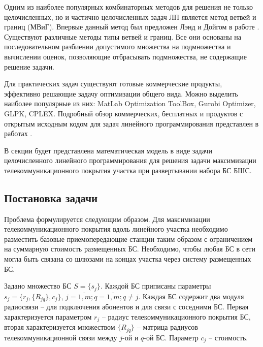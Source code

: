 Одним из наиболее популярных комбинаторных методов для решения не только целочисленных, но и частично целочисленных задач ЛП является метод ветвей и границ (МВиГ). Впервые данный метод  был предложен Лэнд и Дойгом в работе \cite{Land1960}. Существуют различные методы типы ветвей и границ. Все они основаны на последовательном разбиении допустимого множества на подмножества и вычислении оценок, позволяющие отбрасывать подмножества, не содержащие решение задачи.





Для  практических задач существуют готовые коммерческие продукты, эффективно решающие задачу оптимизации общего вида. Можно выделить наиболее популярные из них: MatLab Optimization ToolBox, Gurobi Optimizer, GLPK, CPLEX. Подробный обзор коммерческих, бесплатных и продуктов с открытым исходным кодом для задач линейного программирования представлен в работах \cite{Meindl2012, Ku2016, Anand2017}. 

В секции будет представлена математическая модель в виде задачи целочисленного линейного программирования для решения задачи максимизации телекоммуникационного покрытия участка при развертывании набора БС БШС.

\subsection{Постановка задачи}

Проблема формулируется следующим образом. Для максимизации телекоммуникационного покрытия вдоль линейного участка необходимо разместить базовые приемопередающие станции таким образом с ограничением на суммарную стоимость размещенных БС. Необходимо, чтобы любая БС в сети могла быть связана со шлюзами на концах участка через систему размещенных БС.

Задано множество БС $S = \{s_j\}$. Каждой БС приписаны параметры  $s_j = \{r_j, \{R_{jq}\}, c_j \}$, $j = \overline{1,m}; q = \overline{1,m}; q \neq j$. 
Каждая БС содержит два модуля радиосвязи -- для подключения абонентов и для связи с соседними БС. Первая характеризуется параметром $r_j$ -- радиус телекоммуникационного покрытия БС, вторая характеризуется множеством $\{R_{jq} \}$ -- матрица радиусов телекоммуникационной связи между $j$-ой и $q$-ой БС. Параметр $c_j$ -- стоимость. 

